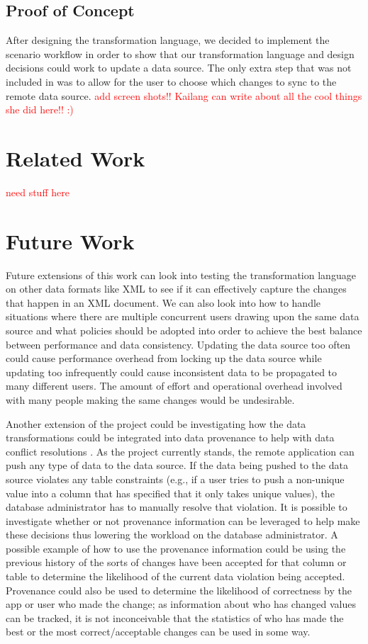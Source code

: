 \documentclass[12pt]{article}
\begin{document}
\subsection{Proof of Concept}
After designing the transformation language, we decided to implement the scenario workflow in order to show that our transformation language and design decisions could work to update a data source. The only extra step that was not included in \cite{arniThesis} was to allow for the user to choose which changes to sync to the remote data source. \textcolor{red}{add screen shots!! Kailang can write about all the cool things she did here!! :)}

\section{Related Work}
\textcolor{red}{need stuff here}

\section{Future Work}
Future extensions of this work can look into testing the transformation language on other data formats like XML to see if it can effectively capture the changes that happen in an XML document. We can also look into how to handle situations where there are multiple concurrent users drawing upon the same data source and what policies should be adopted into order to achieve the best balance between performance and data consistency. Updating the data source too often could cause performance overhead from locking up the data source while updating too infrequently could cause inconsistent data to be propagated to many different users. The amount of effort and operational overhead involved with many people making the same changes would be undesirable. 

Another extension of the project could be investigating how the data transformations could be integrated into data provenance to help with data conflict resolutions \cite{arniThesis}. As the project currently stands, the remote application can push any type of data to the data source. If the data being pushed to the data source violates any table constraints (e.g., if a user tries to push a non-unique value into a column that has specified that it only takes unique values), the database administrator has to manually resolve that violation. It is possible to investigate whether or not provenance information can be leveraged to help make these decisions thus lowering the workload on the database administrator. A possible example of how to use the provenance information could be using the previous history of the sorts of changes have been accepted for that column or table to determine the likelihood of the current data violation being accepted. Provenance could also be used to determine the likelihood of correctness by the app or user who made the change; as information about who has changed values can be tracked, it is not inconceivable that the statistics of who has made the best or the most correct/acceptable changes can be used in some way.



\end{document}
